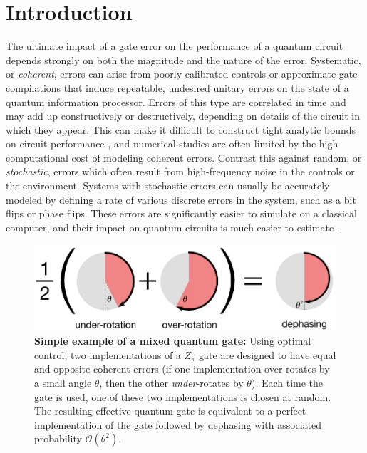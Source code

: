 \documentclass[aps,nofootinbib,pra,notitlepage,twocolumn]{revtex4-1}
\newcommand{\order}[1]{\mathcal{O}\left( #1 \right)}
\newcommand{\0}{\ensuremath{\mathbf{0}}}
\begin{document}
\section{Introduction}
\label{sec:introduction}
\noindent The ultimate impact of a gate error on the performance of a quantum circuit depends strongly on both the magnitude and the nature of the error. Systematic, or \emph{coherent}, errors can arise from poorly calibrated controls or approximate gate compilations that induce repeatable, undesired unitary errors on the state of a quantum information processor. Errors of this type are correlated in time and may add up constructively or destructively, depending on details of the circuit in which they appear. This can make it difficult to construct tight analytic bounds on circuit performance \cite{Beale2018}, and numerical studies are often limited by the high computational cost of modeling coherent errors. Contrast this against random, or \emph{stochastic}, errors which often result from high-frequency noise in the controls or the environment. Systems with stochastic errors can usually be accurately modeled by defining a rate of various discrete errors in the system, such as a bit flips or phase flips. These errors are significantly easier to simulate on a classical computer, and their impact on quantum circuits is much easier to estimate \cite{Beale2018}.

\begin{figure}[t]
  \centering
  \includegraphics[width=\columnwidth]{simple_example.pdf}
  \caption{\textbf{Simple example of a mixed quantum gate:} Using optimal control, two implementations of a $Z_\pi$ gate are designed to have equal and opposite coherent errors (if one implementation over-rotates by a small angle $\theta$, then the other \emph{under}-rotates by $\theta$). Each time the gate is used, one of these two implementations is chosen at random. The resulting effective quantum gate is equivalent to a perfect implementation of the gate followed by dephasing with associated probability $\order{\theta^2}$.}
  \label{fig:simple_example}
\end{figure}
\end{document}
